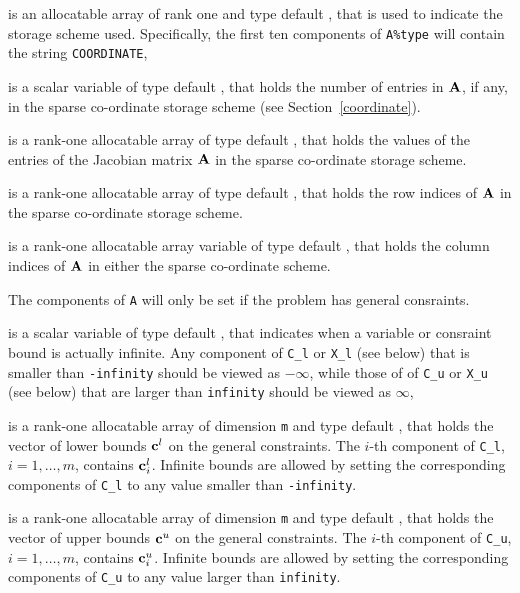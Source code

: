 \documentclass{galahad}
\begin{document}
\begin{description}
\begin{description}

 is an allocatable array of rank one and type default \character,
that is used to indicate the storage scheme used. Specifically,
the first ten components of {\tt A\%type} will contain the
string {\tt COORDINATE},

 is a scalar variable of type default \integer, that
holds the number of entries in ${\mathbf{A}}$, if any,
in the sparse co-ordinate storage scheme (see Section~\ref{coordinate}).

 is a rank-one allocatable array of type default \realdp, that holds
the values of the entries of the Jacobian matrix ${\mathbf{A}}$
in the sparse co-ordinate storage scheme.

 is a rank-one allocatable array of type default \integer,
that holds the row indices of ${\mathbf{A}}$ in the sparse co-ordinate storage scheme.

 is a rank-one allocatable array variable of type default \integer,
that holds the column indices of ${\mathbf{A}}$ in either the sparse co-ordinate scheme.
\end{description}

The components of {\tt A} will only be set if the problem has general
consraints.

 is a scalar variable of type default \realdp, that indicates
when a variable or consraint bound is actually infinite. Any component
of {\tt C\_l} or {\tt X\_l} (see below) that is smaller than {\tt -infinity}
should be viewed as $- \infty$, while those of
of {\tt C\_u} or {\tt X\_u} (see below) that are larger than {\tt infinity}
should be viewed as $\infty$,

 is a rank-one allocatable array of dimension {\tt m} and type
default \realdp, that holds the vector of lower bounds ${\mathbf{c}}^{l}$
on the general constraints. The $i$-th component of
{\tt C\_l}, $i = 1, \ldots , m$, contains ${\mathbf{c}}_{i}^{l}$.
Infinite bounds are allowed by setting the corresponding
components of {\tt C\_l} to any value smaller than {\tt -infinity}.

 is a rank-one allocatable array of dimension {\tt m} and type
default \realdp, that holds the vector of upper bounds ${\mathbf{c}}^{u}$
on the general constraints. The $i$-th component of
{\tt C\_u}, $i = 1,  \ldots ,  m$, contains ${\mathbf{c}}_{i}^{u}$.
Infinite bounds are allowed by setting the corresponding
components of {\tt C\_u} to any value larger than {\tt infinity}.


\end{description}
\end{document}
